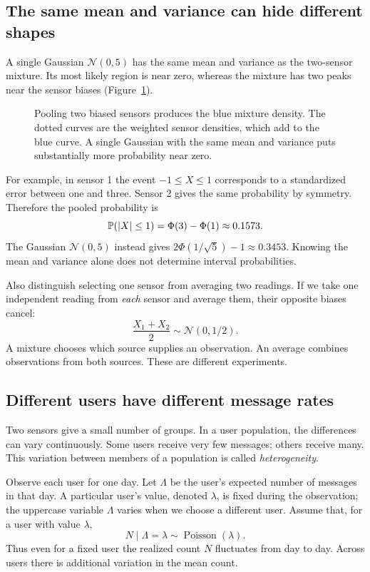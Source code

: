 \subsection{The same mean and variance can hide different shapes}

A single Gaussian \(\mathcal N(0,5)\) has the same mean and variance as
the two-sensor mixture. Its most likely region is near zero, whereas
the mixture has two peaks near the sensor biases
(Figure~\ref{fig:gaussian-mixture}).

\begin{figure}[htbp]
  \centering
  
  \caption{Pooling two biased sensors produces the blue mixture density.
  The dotted curves are the weighted sensor densities, which add to the
  blue curve. A single Gaussian with the same mean and variance puts
  substantially more probability near zero.}
  \label{fig:gaussian-mixture}
\end{figure}

For example, in sensor 1 the event \(-1\le X\le1\) corresponds to a
standardized error between one and three. Sensor 2 gives the same
probability by symmetry. Therefore the pooled probability is
\[
  \mathbb{P}(|X|\le1)=\Phi(3)-\Phi(1)\approx0.1573.
\]
The Gaussian \(\mathcal N(0,5)\) instead gives
\(2\Phi(1/\sqrt5)-1\approx0.3453\).
Knowing the mean and variance alone does not determine interval
probabilities.

Also distinguish selecting one sensor from averaging two readings.
If we take one independent reading from \emph{each} sensor and average
them, their opposite biases cancel:
\[
  \frac{X_1+X_2}{2}\sim\mathcal N(0,1/2).
\]
A mixture chooses which source supplies an observation. An average
combines observations from both sources. These are different experiments.

\subsection{Different users have different message rates}

Two sensors give a small number of groups. In a user population, the
differences can vary continuously. Some users receive very few messages;
others receive many. This variation between members of a population is
called \emph{heterogeneity}.

Observe each user for one day. Let \(\Lambda\) be the user's expected
number of messages in that day. A particular user's value, denoted
\(\lambda\), is fixed during the observation; the uppercase variable
\(\Lambda\) varies when we choose a different user.
Assume that, for a user with value \(\lambda\),
\[
  N\mid\Lambda=\lambda\sim\operatorname{Poisson}(\lambda).
\]
Thus even for a fixed user the realized count \(N\) fluctuates from day
to day. Across users there is additional variation in the mean count.

